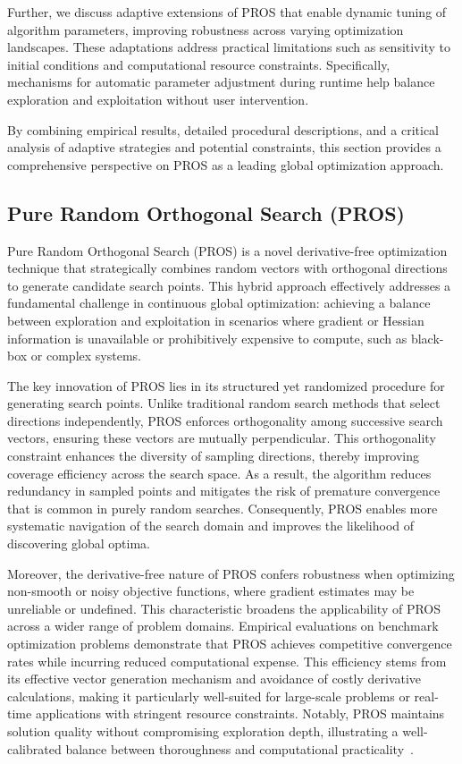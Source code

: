 \documentclass[sigconf]{acmart}
\begin{document}
Further, we discuss adaptive extensions of PROS that enable dynamic tuning of algorithm parameters, improving robustness across varying optimization landscapes. These adaptations address practical limitations such as sensitivity to initial conditions and computational resource constraints. Specifically, mechanisms for automatic parameter adjustment during runtime help balance exploration and exploitation without user intervention.

By combining empirical results, detailed procedural descriptions, and a critical analysis of adaptive strategies and potential constraints, this section provides a comprehensive perspective on PROS as a leading global optimization approach.

\subsection{Pure Random Orthogonal Search (PROS)}

Pure Random Orthogonal Search (PROS) is a novel derivative-free optimization technique that strategically combines random vectors with orthogonal directions to generate candidate search points. This hybrid approach effectively addresses a fundamental challenge in continuous global optimization: achieving a balance between exploration and exploitation in scenarios where gradient or Hessian information is unavailable or prohibitively expensive to compute, such as black-box or complex systems.

The key innovation of PROS lies in its structured yet randomized procedure for generating search points. Unlike traditional random search methods that select directions independently, PROS enforces orthogonality among successive search vectors, ensuring these vectors are mutually perpendicular. This orthogonality constraint enhances the diversity of sampling directions, thereby improving coverage efficiency across the search space. As a result, the algorithm reduces redundancy in sampled points and mitigates the risk of premature convergence that is common in purely random searches. Consequently, PROS enables more systematic navigation of the search domain and improves the likelihood of discovering global optima.

Moreover, the derivative-free nature of PROS confers robustness when optimizing non-smooth or noisy objective functions, where gradient estimates may be unreliable or undefined. This characteristic broadens the applicability of PROS across a wider range of problem domains. Empirical evaluations on benchmark optimization problems demonstrate that PROS achieves competitive convergence rates while incurring reduced computational expense. This efficiency stems from its effective vector generation mechanism and avoidance of costly derivative calculations, making it particularly well-suited for large-scale problems or real-time applications with stringent resource constraints. Notably, PROS maintains solution quality without compromising exploration depth, illustrating a well-calibrated balance between thoroughness and computational practicality~\cite{ref8}.
\end{document}
